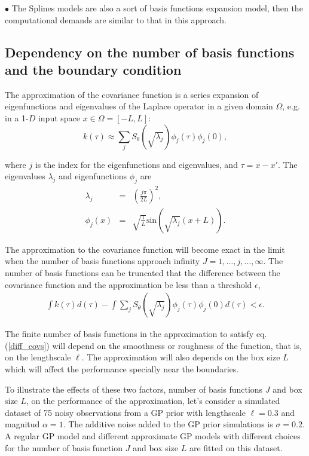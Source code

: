 \documentclass[]{interact}
\theoremstyle{plain}%
\theoremstyle{definition}
\theoremstyle{remark}
\begin{document}
\vspace{2mm}
$\bullet$ The Splines models are also a sort of basis functions expansion model, then the computational demands are similar to that in this approach.


\subsection{Dependency on the number of basis functions and the boundary condition}

The approximation of the covariance function is a series expansion of eigenfunctions and eigenvalues of the Laplace operator in a given domain $\Omega$, e.g. in a 1-$D$ input space $x\in \Omega=[-L,L]$:
%
\begin{equation}\label{approxcov}
k(\tau) \approx \sum_{j}S_{\theta}(\sqrt{\lambda_j}) \phi_j(\tau) \phi_j(0),  \nonumber
\end{equation} 

\noindent where $j$ is the index for the eigenfunctions and eigenvalues, and $\tau=x-x'$. The eigenvalues $\lambda_j$ and eigenfunctions $\phi_j$ are 
%
\begin{eqnarray}
\lambda_j&=&\left(\frac{j\pi}{2L}\right)^2, \nonumber \\
\phi_j(x)&=&\sqrt{\frac{1}{L}} \text{sin}\left(\sqrt{\lambda_j}(x+L)\right). \nonumber
\end{eqnarray} 

The approximation to the covariance function will become exact in the limit when the number of basis functions approach infinity $J=1,\dots,j,\dots,\infty$. The number of basis functions can be truncated that the difference between the covariance function and the approximation be less than a threshold $\epsilon$,
%
\begin{eqnarray}\label{diff_covs}
\int k(\tau)d(\tau) - \int \sum_{j}S_{\theta}(\sqrt{\lambda_j}) \phi_j(\tau) \phi_j(0) d(\tau) < \epsilon.
\end{eqnarray}

The finite number of basis functions in the approximation to satisfy eq. (\ref{diff_covs}) will depend on the smoothness or roughness of the function, that is, on the lengthscale $\ell$. The approximation will also depends on the box size $L$ which will affect the performance specially near the boundaries. 

To illustrate the effects of these two factors, number of basis functions $J$ and box size $L$, on the performance of the approximation, let's consider a simulated dataset of 75 noisy observations from a GP prior with lengthscale $\ell=0.3$ and magnitud $\alpha=1$. The additive noise added to the GP prior simulations is $\sigma=0.2$. A regular GP model and different approximate GP models with different choices for the number of basis function $J$ and box size $L$ are fitted on this dataset. 
\end{document}
